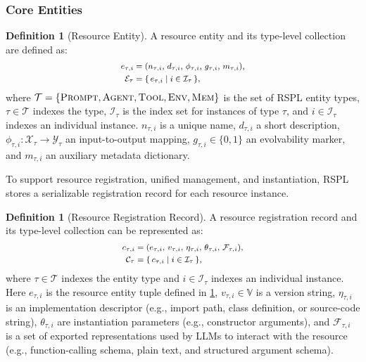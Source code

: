 \documentclass{article}
\newcommand{\Tau}{\mathcal{T}}
\theoremstyle{plain}
\theoremstyle{definition}
\newtheorem{definition}[theorem]{Definition}
\theoremstyle{remark}
\begin{document}
\vspace{-0.2cm}
\subsubsection{Core Entities}
\vspace{-0.2cm}

\begin{definition}[Resource Entity]
\label{def:resource-entity}
A resource entity and its type-level collection are defined as:
\begin{equation}
\footnotesize
\begin{aligned}
e_{\tau,i} &= (n_{\tau,i},\, d_{\tau,i},\, \phi_{\tau,i},\, g_{\tau,i},\, m_{\tau,i}),\\
\mathcal{E}_{\tau} &= \{\, e_{\tau,i} \mid i \in \mathcal{I}_{\tau} \,\},
\end{aligned}
\end{equation}
where $\Tau = \{\textsc{Prompt},\textsc{Agent},\textsc{Tool},\textsc{Env},\textsc{Mem}\}$ is the set of RSPL entity types, $\tau \in \Tau$ indexes the type, $\mathcal{I}_\tau$ is the index set for instances of type $\tau$, and $i \in \mathcal{I}_\tau$ indexes an individual instance. $n_{\tau,i}$ is a unique name, $d_{\tau,i}$ a short description, $\phi_{\tau,i}:\mathcal{X}_{\tau} \rightarrow \mathcal{Y}_{\tau}$ an input-to-output mapping, $g_{\tau,i} \in \{0,1\}$ an evolvability marker, and $m_{\tau,i}$ an auxiliary metadata dictionary.
\end{definition}

To support resource registration, unified management, and instantiation, RSPL stores a serializable registration record for each resource instance.
\begin{definition}[Resource Registration Record]
  \label{def:resource-registration-record}
  A resource registration record and its type-level collection can be represented as:
  \begin{equation}
  \footnotesize
  \begin{aligned}
  c_{\tau,i} &= (e_{\tau,i},\, v_{\tau,i},\, \eta_{\tau,i},\, \theta_{\tau,i},\, \mathcal{F}_{\tau,i}),\\
  \mathcal{C}_{\tau} &= \{\, c_{\tau,i} \mid i \in \mathcal{I}_{\tau} \,\},
  \end{aligned}
  \end{equation}
  where $\tau \in \Tau$ indexes the entity type and $i \in \mathcal{I}_\tau$ indexes an individual instance. Here $e_{\tau,i}$ is the resource entity tuple defined in \cref{def:resource-entity}, $v_{\tau,i} \in \mathbb{V}$ is a version string, $\eta_{\tau,i}$ is an implementation descriptor (e.g., import path, class definition, or source-code string), $\theta_{\tau,i}$ are instantiation parameters (e.g., constructor arguments), and $\mathcal{F}_{\tau,i}$ is a set of exported representations used by LLMs to interact with the resource (e.g., function-calling schema, plain text, and structured argument schema).
  \end{definition}
\end{document}
